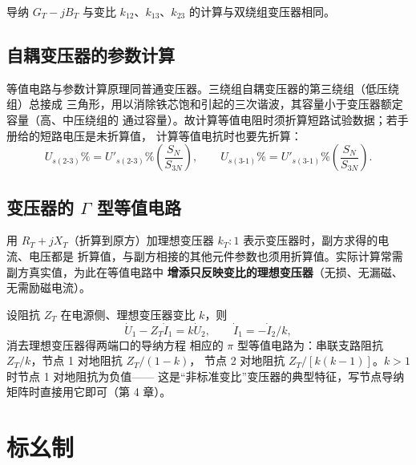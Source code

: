 导纳 $G_T-jB_T$ 与变比 $k_{12}$、$k_{13}$、$k_{23}$ 的计算与双绕组变压器相同。

\subsection{自耦变压器的参数计算}

等值电路与参数计算原理同普通变压器。三绕组自耦变压器的第三绕组（低压绕组）总接成
三角形，用以消除铁芯饱和引起的三次谐波，其容量小于变压器额定容量（高、中压绕组的
通过容量）。故计算等值电阻时须折算短路试验数据；若手册给的短路电压是未折算值，
计算等值电抗时也要先折算：
\begin{equation}
  U_{s(2\text{-}3)}\%=U'_{s(2\text{-}3)}\%\left(\frac{S_N}{S_{3N}}\right),
  \qquad
  U_{s(3\text{-}1)}\%=U'_{s(3\text{-}1)}\%\left(\frac{S_N}{S_{3N}}\right).
\end{equation}

\subsection{变压器的 $\Gamma$ 型等值电路}

用 $R_T+jX_T$（折算到原方）加理想变压器 $k_T:1$ 表示变压器时，副方求得的电流、电压都是
折算值，与副方相接的其他元件参数也须用折算值。实际计算常需副方真实值，为此在等值电路中
\textbf{增添只反映变比的理想变压器}（无损、无漏磁、无需励磁电流）。

设阻抗 $Z_T$ 在电源侧、理想变压器变比 $k$，则
\begin{equation}
  \dot U_1-Z_T\dot I_1=k\dot U_2,\qquad \dot I_1=-\dot I_2/k ,
\end{equation}
消去理想变压器得两端口的导纳方程
相应的 $\pi$ 型等值电路为：串联支路阻抗 $Z_T/k$，节点 1 对地阻抗 $Z_T/(1-k)$，
节点 2 对地阻抗 $Z_T/\left[k(k-1)\right]$。$k>1$ 时节点 1 对地阻抗为负值——
这是“非标准变比”变压器的典型特征，写节点导纳矩阵时直接用它即可（第 4 章）。

\section{标幺制}

